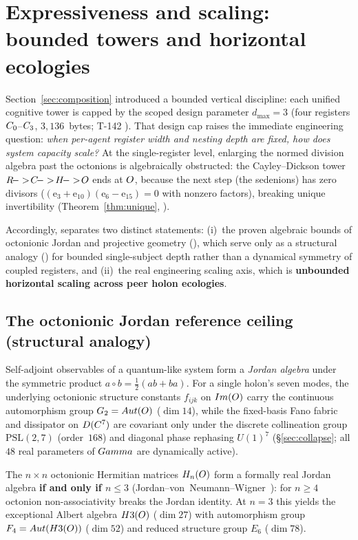\section{Expressiveness and scaling: bounded towers and horizontal ecologies}
\label{sec:scaling}

Section~\ref{sec:composition} introduced a bounded vertical discipline: each
unified cognitive tower is capped by the scoped design parameter $d_{\max}=3$
(four registers $C_0$--$C_3$, $3{,}136$~bytes; T-142 ). That
design cap raises the immediate engineering question: \emph{when per-agent
register width and nesting depth are fixed, how does system capacity scale?}
At the single-register level, enlarging the normed division algebra past the
octonions is algebraically obstructed: the Cayley--Dickson tower
$R\!->\!C\!->\!H\!->\!O$ ends at $O$,
because the next step (the sedenions) has zero divisors
($(\mathrm{e}_3+\mathrm{e}_{10})(\mathrm{e}_6-\mathrm{e}_{15})=0$ with
nonzero factors), breaking unique invertibility (Theorem~\ref{thm:unique},
\cite{baez2002}).

Accordingly, \TALOS{} separates two distinct statements: (i)~the proven
algebraic bounds of octonionic Jordan and projective geometry (),
which serve only as a structural analogy () for bounded single-subject
depth rather than a dynamical symmetry of coupled registers, and (ii)~the real
engineering scaling axis, which is \textbf{unbounded horizontal scaling across
peer holon ecologies}.

\subsection{The octonionic Jordan reference ceiling (structural analogy)}
\label{subsec:jordan}

Self-adjoint observables of a quantum-like system form a \emph{Jordan algebra}
under the symmetric product $a\circ b=\tfrac12(ab+ba)$. For a single holon's
seven modes, the underlying octonionic structure constants $f_{ijk}$ on
$Im(O)$ carry the continuous automorphism group
$G_2=Aut(O)$ ($\dim 14$), while the fixed-basis Fano fabric and
dissipator on $D(C^7)$ are covariant only under the discrete
collineation group $\mathrm{PSL}(2,7)$ (order~$168$) and diagonal phase
rephasing $U(1)^7$ (\S\ref{sec:collapse}; all $48$ real parameters of $Gamma$
are dynamically active).

\begin{theorem}
\label{thm:jordan-ceiling}
The $n\times n$ octonionic Hermitian matrices $H_n(O)$ form a
formally real Jordan algebra \textbf{if and only if $n\leq 3$}
(Jordan--von~Neumann--Wigner~\cite{jordan1934}): for $n\geq 4$ octonion
non-associativity breaks the Jordan identity. At $n=3$ this yields the
exceptional Albert algebra $H3(O)$ ($\dim 27$) with automorphism group
$F_4=Aut(H3(O))$ ($\dim 52$) and reduced structure group $E_6$
($\dim 78$).
\end{theorem}

